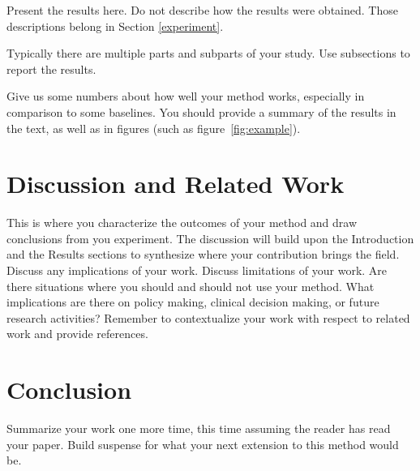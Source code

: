 \documentclass[twoside,11pt]{article}
\begin{document}
Present the results here.
Do not describe how the results were obtained.
Those descriptions belong in Section \ref{experiment}.

Typically there are multiple parts and subparts of your study.
Use subsections to report the results.

Give us some numbers about how well your method works, especially in comparison to some baselines.
You should provide a summary of the results in the text, as well as in figures (such as figure~\ref{fig:example}).  

\section{Discussion and Related Work} 

This is where you characterize the outcomes of your method and draw conclusions from you experiment.
The discussion will build upon the Introduction and the Results sections to synthesize where your contribution brings the field. Discuss any implications of your work. 
Discuss limitations of your work.
Are there situations where you should and should not use your method.
What implications are there on policy making, clinical decision making, or future research activities?
Remember to contextualize your work with respect to related work and provide references.

\section{Conclusion} 
Summarize your work one more time, this time assuming the reader has read your paper.
Build suspense for what your next extension to this method would be.

\end{document}
